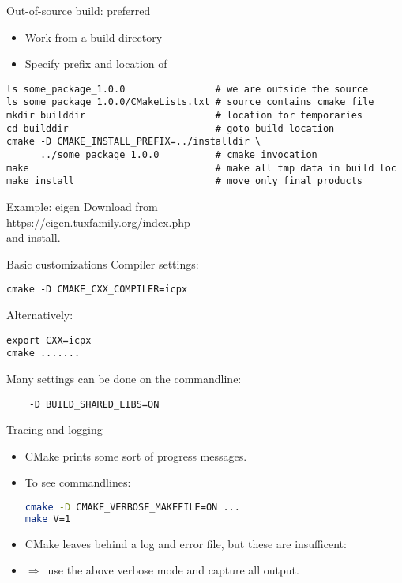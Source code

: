 \begin{numberedframe}{Out-of-source build: preferred}
  \begin{itemize}
  \item Work from a build directory
  \item Specify prefix and location of 
  \end{itemize}
\lstset{numbers=left,numberstyle=\tiny}
\begin{lstlisting}
ls some_package_1.0.0                # we are outside the source
ls some_package_1.0.0/CMakeLists.txt # source contains cmake file
mkdir builddir                       # location for temporaries
cd builddir                          # goto build location
cmake -D CMAKE_INSTALL_PREFIX=../installdir \
      ../some_package_1.0.0          # cmake invocation
make                                 # make all tmp data in build loc
make install                         # move only final products
\end{lstlisting}
\end{numberedframe}

\begin{numberedframe}{Example: eigen}
  Download from\\
  \url{https://eigen.tuxfamily.org/index.php}\\
  and install.
\end{numberedframe}

\begin{numberedframe}{Basic customizations}
  Compiler settings:
\begin{lstlisting}
cmake -D CMAKE_CXX_COMPILER=icpx
\end{lstlisting}
Alternatively:
\begin{lstlisting}
export CXX=icpx
cmake .......
\end{lstlisting}
Many settings can be done on the commandline:
\begin{lstlisting}
    -D BUILD_SHARED_LIBS=ON
\end{lstlisting}
\end{numberedframe}

\begin{numberedframe}{Tracing and logging}
  \begin{itemize}
  \item CMake prints some sort of progress messages.
  \item To see commandlines:
\begin{lstlisting}[language=bash]
cmake -D CMAKE_VERBOSE_MAKEFILE=ON ...
make V=1
\end{lstlisting}
\item CMake leaves behind a log and error file, but these are insufficent:
  \item $\Rightarrow$~use the above verbose mode and capture all output.
  \end{itemize}
\end{numberedframe}
